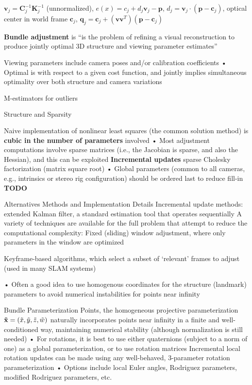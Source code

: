 \documentclass[10pt,landscape]{article}
\begin{document}
\begin{multicols}{3}
$\mathbf{v}_j = \mathbf{C}_j^{-1}\mathbf{K}_j^{-1}$ (unnormalized), $e(x) = c_j + d_j\mathbf{v}_j-\mathbf{p}$, $d_j = \mathbf{v}_j \cdot (\mathbf{p} - \mathbf{c}_j)$, optical center in world frame $\mathbf{c}_j$, $\mathbf{q}_j = \mathbf{c}_j + (\mathbf{v}\mathbf{v}^T)(\mathbf{p}-\mathbf{c}_j)$

\textbf{Bundle adjustment} is “is the problem of refining a visual reconstruction to produce jointly optimal 3D structure and viewing parameter estimates”

Viewing parameters include camera poses and/or calibration coefficients • Optimal is with respect to a given cost function, and jointly implies
simultaneous optimality over both structure and camera variations

M-estimators for outliers

Structure and Sparsity

Naive implementation of nonlinear least squares (the common solution method) is \textbf{cubic in the number of parameters} involved
• Most adjustment computations involve sparse matrices (i.e., the Jacobian
is sparse, and also the Hessian), and this can be exploited
\textbf{Incremental updates} sparse Cholesky factorization (matrix square root)
• Global parameters (common to all cameras, e.g., intrinsics or stereo rig configuration) should be ordered last to reduce fill-in
\textbf{TODO}

Alternatives Methods and Implementation Details
Incremental update methods: extended Kalman filter, a standard estimation tool that operates sequentially
A variety of techniques are available for the full problem that attempt to reduce the computational complexity: Fixed (sliding) window adjustment, where only parameters in the window are optimized

Keyframe-based algorithms, which select a subset of ‘relevant’ frames to adjust (used in many SLAM systems)

• Often a good idea to use homogenous coordinates for the structure (landmark) parameters to avoid numerical instabilities for points near infinity

Bundle Parameterization
Points, the homogeneous projective parameterization $\mathbf{\Tilde{x}} = (\Tilde{x}, \Tilde{y}, \Tilde{z}, \Tilde{w})$
naturally incorporates points near infinity in a finite and well-conditioned way, maintaining numerical stability (although normalization is still needed)
• For rotations, it is best to use either quaternions (subject to a norm of one) as a global parameterization, or to use rotation matrices
Incremental local rotation updates can be made using any well-behaved, 3-parameter rotation parameterization
• Options include local Euler angles, Rodriguez parameters, modified Rodriguez parameters, etc.


\end{multicols}
\end{document}

